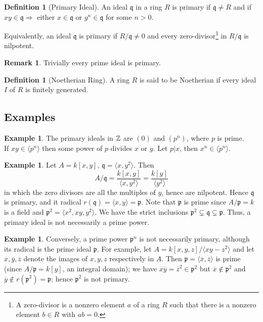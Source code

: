 \documentclass[	DIV=calc,paper=a4,fontsize=11pt]{scrartcl}	 					%
\theoremstyle{definition}
\newtheorem{defn}[thm]{Definition}
\newtheorem{exmp}[thm]{Example}
\newtheorem{rem}[thm]{Remark}
\theoremstyle{plain}
\theoremstyle{remark}
\begin{document}
\begin{defn}[Primary Ideal]
An ideal $\mathfrak{q}$ in a ring $R$ is primary if $\mathfrak{q}\neq R$ and if $xy\in \mathfrak{q}\Rightarrow$ either $x\in \mathfrak{q}$ or $y^n\in \mathfrak{q}$ for some $n>0$.
\end{defn}
Equivalently, an ideal $\mathfrak{q}$ is primary if $R/ \mathfrak{q}\neq 0$ and every zero-divisor\footnote{A zero-divisor is a nonzero element $a$ of a ring $R$ such that there is a nonzero element $b\in R$ with $ab=0$.} in $R/ \mathfrak{q}$ is nilpotent.

\begin{rem}
Trivially every prime ideal is primary.
\end{rem}

\begin{defn}[Noetherian Ring]
A ring $R$ is said to be Noetherian if every ideal $I$ of $R$ is finitely generated.
\end{defn}
\subsection{Examples}

\begin{exmp}
The primary ideals in $\Bbb Z$ are $(0)$ and $(p^n)$, where $p$ is prime.\\
If $xy\in \langle p^n\rangle$ then some power of $p$ divides $x$ or $y$. Let $p|x$, then $x^n\in \langle p^n\rangle$.
\end{exmp}

\begin{exmp}
Let $A = k[x,y]$, $\mathfrak{q}=\langle x,y^2 \rangle$. Then
\[A/\mathfrak{q}=\frac{k[x,y]}{\langle x,y^2 \rangle}=\frac{k[y]}{\langle y^2 \rangle}\]
in which the zero divisors are all the multiples of $y$, hence are nilpotent. Hence $\mathfrak{q}$ is primary, and it radical $r(\mathfrak{q})=\langle x,y \rangle=\mathfrak{p}$. Note that $\mathfrak{p}$ is prime since $A/\mathfrak{p}=k$ is a field and $\mathfrak{p}^2=\langle x^2,xy,y^2 \rangle$. We have the strict inclusions $\mathfrak{p}^2\subsetneq \mathfrak{q}\subsetneq \mathfrak{p}$. Thus, a primary ideal is not necessarily a prime power.
\end{exmp}
\begin{exmp}
Conversely, a prime power $\mathfrak{p}^n$ is not necessarily primary, although its
radical is the prime ideal $\mathfrak{p}$. For example, let $A = k[x, y, z]/\langle xy-z^2\rangle$ and let
$\overline{x}, \overline{y}, \overline{z}$ denote the images of $x, y, z$ respectively in $A$. Then $\mathfrak{p}= \langle \overline{x}, \overline{z}\rangle$ is prime (since $A/\mathfrak{p}=k[y]$, an integral domain); we have $\overline{x}\overline{y} = \overline{z}^2\in \mathfrak{p}^2$ but $\overline{x}\notin \mathfrak{p}^2$ and
$\overline{y}\notin r(\mathfrak{p}^2) =\mathfrak{p}$; hence $\mathfrak{p}^2$ is not primary.
\end{exmp}
\end{document}
